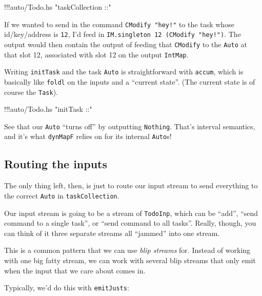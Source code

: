 \documentclass[]{article}
\newenvironment{Shaded}{}{}
\newcommand{\StringTok}[1]{\textcolor[rgb]{0.25,0.44,0.63}{{#1}}}
\newcommand{\FunctionTok}[1]{\textcolor[rgb]{0.02,0.16,0.49}{{#1}}}
\newcommand{\NormalTok}[1]{{#1}}
\begin{document}
\begin{Shaded}
\begin{Highlighting}[]
\FunctionTok{!!!}\NormalTok{auto}\FunctionTok{/}\NormalTok{Todo.hs }\StringTok{"taskCollection ::"}
\end{Highlighting}
\end{Shaded}

If we wanted to send in the command \texttt{CModify\ "hey!"} to the task
whose id/key/address is \texttt{12}, I'd feed in
\texttt{IM.singleton\ 12\ (CModify\ "hey!")}. The output would then
contain the output of feeding that \texttt{CModify} to the \texttt{Auto}
at that slot 12, associated with slot 12 on the output \texttt{IntMap}.

Writing \texttt{initTask} and the task \texttt{Auto} is straightforward
with \texttt{accum}, which is basically like \texttt{foldl} on the
inputs and a ``current state''. (The current state is of course the
\texttt{Task}).

\begin{Shaded}
\begin{Highlighting}[]
\FunctionTok{!!!}\NormalTok{auto}\FunctionTok{/}\NormalTok{Todo.hs }\StringTok{"initTask ::"}
\end{Highlighting}
\end{Shaded}

See that our \texttt{Auto} ``turns off'' by outputting \texttt{Nothing}.
That's interval semantics, and it's what \texttt{dynMapF} relies on for
its internal \texttt{Auto}s!

\subsection{Routing the inputs}\label{routing-the-inputs}

The only thing left, then, is just to route our input stream to send
everything to the correct \texttt{Auto} in \texttt{taskCollection}.

Our input stream is going to be a stream of \texttt{TodoInp}, which can
be ``add'', ``send command to a single task'', or ``send command to all
tasks''. Really, though, you can think of it three separate streams all
``jammed'' into one stream.

This is a common pattern that we can use \emph{blip streams} for.
Instead of working with one big fatty stream, we can work with several
blip streams that only emit when the input that we care about comes in.

Typically, we'd do this with \texttt{emitJusts}:
\end{document}
